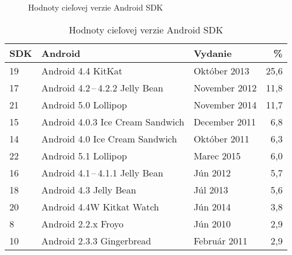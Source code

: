 \begin{figure}[H]
\centering
\begin{bchart}[min=0,max=30,step=5,unit=\%]
\bcskip{6pt}
\bcskip{6pt}
\bcskip{6pt}
\bcskip{6pt}
\bcskip{6pt}
\bcskip{6pt}
\bcskip{6pt}
\bcskip{6pt}
\bcskip{6pt}
\bcskip{6pt}
\end{bchart}

\caption{Hodnoty cieľovej verzie Android SDK}
\label{targetSdkGraf}
\end{figure}

\begin{table}[H]
\centering
  \begin{tabular}{|l l l r|}
    \hline
    \textbf{SDK} & \textbf{Android} & \textbf{Vydanie}& \textbf{\%} \\\hline\hline
    19 & Android 4.4 KitKat & Október 2013 & 25,6 \\
    17 & Android 4.2\,--\,4.2.2 Jelly Bean & November 2012 & 11,8 \\
    21 & Android 5.0 Lollipop & November 2014 & 11,7 \\
    15 & Android 4.0.3 Ice Cream Sandwich & December 2011 & 6,8 \\
    14 & Android 4.0 Ice Cream Sandwich & Október 2011 & 6,3 \\
    22 & Android 5.1 Lollipop & Marec 2015 & 6,0\\
    16 & Android 4.1\,--\,4.1.1 Jelly Bean & Jún 2012 & 5,7 \\
    18 & Android 4.3 Jelly Bean & Júl 2013 & 5,6 \\
    20 & Android 4.4W Kitkat Watch & Jún 2014 & 3,8 \\
    8 & Android 2.2.x Froyo & Jún 2010& 2,9\\
    10 & Android 2.3.3 Gingerbread & Február 2011 & 2,9 \\
    \hline
  \end{tabular}
  \caption{Hodnoty cieľovej verzie Android SDK}
  \label{tab:targetSdk}
\end{table}
